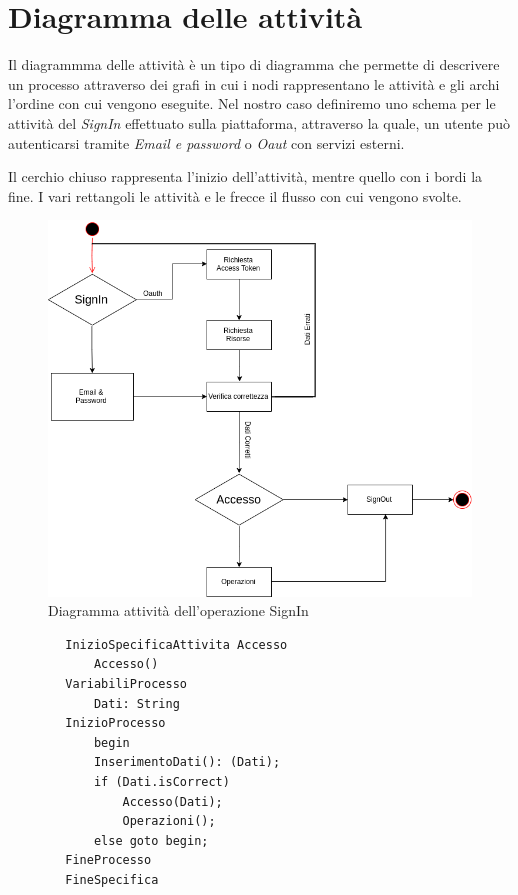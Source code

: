 	\section{Diagramma delle attività}
	Il diagrammma delle attività è un tipo di diagramma che permette di descrivere un processo attraverso dei grafi in cui i nodi rappresentano le attività e gli archi l'ordine con cui vengono eseguite. Nel nostro caso definiremo uno schema per le attività del \textit{SignIn} effettuato sulla piattaforma, attraverso la quale, un utente può autenticarsi tramite \textit{Email e password} o \textit{Oaut} con servizi esterni.
	
	Il cerchio chiuso rappresenta l'inizio dell'attività, mentre quello con i bordi la fine. I vari rettangoli le attività e le frecce il flusso con cui vengono svolte.

	\begin{figure}[H]
		\includegraphics[width=\textwidth]{./media/DiagrammaAttivita.png}
		\caption{Diagramma attività dell'operazione SignIn}
	\end{figure}

	\begin{lstlisting}
		InizioSpecificaAttivita Accesso
			Accesso()
		VariabiliProcesso
			Dati: String
		InizioProcesso
			begin
			InserimentoDati(): (Dati);
			if (Dati.isCorrect)
				Accesso(Dati);
				Operazioni();
			else goto begin;
		FineProcesso
		FineSpecifica
	\end{lstlisting}